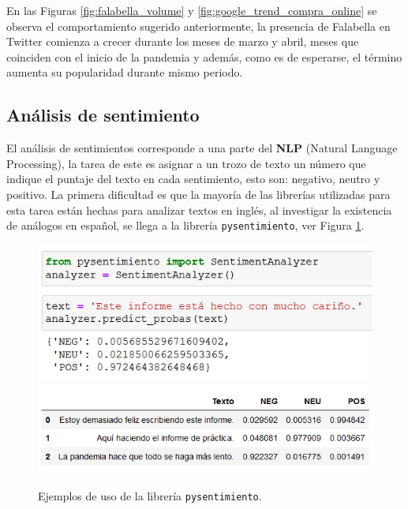 \documentclass{article}
\begin{document}
En las Figuras \ref{fig:falabella_volume} y \ref{fig:google_trend_compra_online} se observa el comportamiento sugerido anteriormente, la presencia de Falabella en Twitter comienza a crecer durante los meses de marzo y abril, meses que coinciden con el inicio de la pandemia y además, como es de esperarse, el término  aumenta su popularidad durante mismo periodo.



\subsection{Análisis de sentimiento}
El análisis de sentimientos corresponde a una parte del \textbf{NLP} (Natural Language Processing), la tarea de este es asignar a un trozo de texto un número que indique el puntaje del texto en cada sentimiento, esto son: negativo, neutro y positivo. La primera dificultad es que la mayoría de las librerías utilizadas para esta tarea están hechas para analizar textos en inglés, al investigar la existencia de análogos en español, se llega a la librería \texttt{pysentimiento}, ver Figura \ref{fig:pysentimiento_example}.\\
\begin{figure}[H]
	\centering
	\includegraphics[scale=.65]{imgs/pysentimiento_example.png}
	\vspace{.5cm}
	\includegraphics[scale=.65]{imgs/pysentimiento_example2.png}
	\caption{Ejemplos de uso de la librería \texttt{pysentimiento}.}
	\label{fig:pysentimiento_example}
\end{figure}
\end{document}

